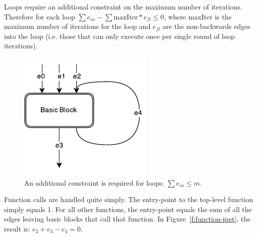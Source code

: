 \documentclass[table,11pt]{article}
\begin{document}


Loops require an additional constraint on the maximum number of iterations. Therefore for each loop $\sum e_{in} - \sum \mathrm{maxIter}*e_{fl} \le 0$, where $\mathrm{maxIter}$ is the maximum number of iterations for the loop and $e_{fl}$ are the non-backwards edges into the loop (i.e. those that can only execute once per single round of loop iterations).


\begin{figure}[h]
\centering
\includegraphics[scale=1]{figures/loopedges.pdf}
\caption{An additional constraint is required for loops: $\sum e_{in} \leq m$.} 
\label{f:loopedges}
\end{figure}


Function calls are handled quite simply. The entry-point to the top-level function simply equals 1. For all other functions, the entry-point equals the sum of all the edges leaving basic blocks that call that function. In Figure~\ref{f:function-ipet}, the result is: $e_2+e_3-e_4 = 0$.
\end{document}
